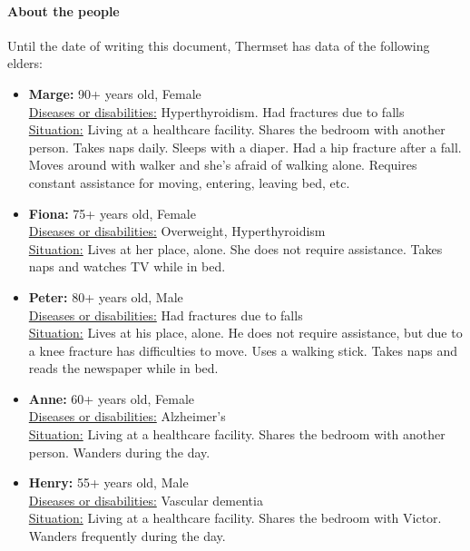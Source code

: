 \documentclass[oneside, twocolumn]{article}
\begin{document}
\paragraph{About the people}
Until the date of writing this document, Thermset has data of the following elders:
\begin{itemize}
	\item \textbf{Marge:} 90+ years old, Female \\
			\underline{Diseases or disabilities:} Hyperthyroidism. Had fractures due to falls \\
			\underline{Situation:} Living at a healthcare facility. Shares the bedroom with another person. Takes naps daily. Sleeps with a diaper. Had a hip fracture after a fall. Moves around with walker and she’s afraid of walking alone. Requires constant assistance for moving, entering, leaving bed, etc. \\
  \item \textbf{Fiona:} 75+ years old, Female \\
			\underline{Diseases or  disabilities:} Overweight, Hyperthyroidism \\
			\underline{Situation:} Lives at her place, alone. She does not require assistance. Takes naps and watches TV while in bed. \\
	\item \textbf{Peter:} 80+ years old, Male \\
			\underline{Diseases or disabilities:} Had fractures due to falls \\
			\underline{Situation:} Lives at his place, alone. He does not require assistance, but due to a knee fracture has difficulties to move. Uses a walking stick. Takes naps and reads the newspaper while in bed. \\
  \iffalse
	\item \textbf{Anne:} 60+ years old, Female \\
			\underline{Diseases or disabilities:} Alzheimer’s \\
			\underline{Situation:} Living at a healthcare facility. Shares the bedroom with another person. Wanders during the day. \\
	\item \textbf{Henry:} 55+ years old,  Male \\
		  	\underline{Diseases or disabilities:} Vascular dementia \\
		  	\underline{Situation:} Living at a healthcare facility. Shares the bedroom with Victor. Wanders frequently during the day. \\


\end{itemize}
\end{document}
